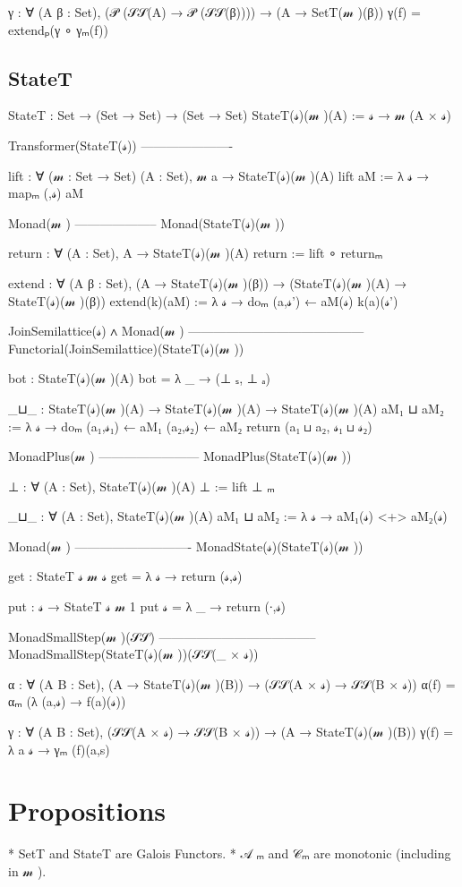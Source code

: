 \documentclass{article}
\begin{document}
γ : ∀ (A β : Set), (𝒫 (𝒮𝒮(A) → 𝒫 (𝒮𝒮(β)))) → (A → SetT(𝓂 )(β))
γ(f) = extendₚ(γ ∘ γₘ(f))



\subsection{StateT}
\label{section:Proofs+Definitions:StateT}

StateT : Set → (Set → Set) → (Set → Set)
StateT(𝓈)(𝓂 )(A) := 𝓈 → 𝓂  (A × 𝓈)

Transformer(StateT(𝓈))
----------------------

lift : ∀ (𝓂  : Set → Set) (A : Set), 𝓂  a → StateT(𝓈)(𝓂 )(A)
lift aM := λ 𝓈 → mapₘ (,𝓈) aM

Monad(𝓂 )
--------------------
Monad(StateT(𝓈)(𝓂 ))

return : ∀ (A : Set), A → StateT(𝓈)(𝓂 )(A)
return := lift ∘ returnₘ

extend : ∀ (A β : Set), (A → StateT(𝓈)(𝓂 )(β)) → (StateT(𝓈)(𝓂 )(A) → StateT(𝓈)(𝓂 )(β))
extend(k)(aM) := λ 𝓈 → doₘ
  (a,𝓈') ← aM(𝓈)
  k(a)(𝓈')

JoinSemilattice(𝓈) ∧ Monad(𝓂 )
------------------------------------------
Functorial(JoinSemilattice)(StateT(𝓈)(𝓂 ))

bot : StateT(𝓈)(𝓂 )(A)
bot = λ _ → (⊥ ₛ, ⊥ ₐ)

_⊔_ : StateT(𝓈)(𝓂 )(A) → StateT(𝓈)(𝓂 )(A) → StateT(𝓈)(𝓂 )(A)
aM₁ ⊔ aM₂ := λ 𝓈 → doₘ
  (a₁,𝓈₁) ← aM₁
  (a₂,𝓈₂) ← aM₂
  return (a₁ ⊔ a₂, 𝓈₁ ⊔ 𝓈₂)

MonadPlus(𝓂 )
------------------------
MonadPlus(StateT(𝓈)(𝓂 ))

⊥ : ∀ (A : Set), StateT(𝓈)(𝓂 )(A)
⊥ := lift ⊥ ₘ

_⊔_ : ∀ (A : Set), StateT(𝓈)(𝓂 )(A)
aM₁ ⊔ aM₂ := λ 𝓈 → aM₁(𝓈) <+> aM₂(𝓈)

Monad(𝓂 )
----------------------------
MonadState(𝓈)(StateT(𝓈)(𝓂 ))

get : StateT 𝓈 𝓂  𝓈
get = λ 𝓈 → return (𝓈,𝓈)

put : 𝓈 → StateT 𝓈 𝓂  1
put 𝓈 = λ _ → return (∙,𝓈)

MonadSmallStep(𝓂 )(𝒮𝒮)
--------------------------------------
MonadSmallStep(StateT(𝓈)(𝓂 ))(𝒮𝒮(_ × 𝓈))

α : ∀ (A B : Set), (A → StateT(𝓈)(𝓂 )(B)) → (𝒮𝒮(A × 𝓈) → 𝒮𝒮(B × 𝓈))
α(f) = αₘ (λ (a,𝓈) → f(a)(𝓈))

γ : ∀ (A B : Set), (𝒮𝒮(A × 𝓈) → 𝒮𝒮(B × 𝓈)) → (A → StateT(𝓈)(𝓂 )(B))
γ(f) = λ a 𝓈 → γₘ (f)(a,s)



\section{Propositions}

* SetT and StateT are Galois Functors.
* 𝒜 ₘ and 𝒞ₘ are monotonic (including in 𝓂 ).



{}

\end{document}
